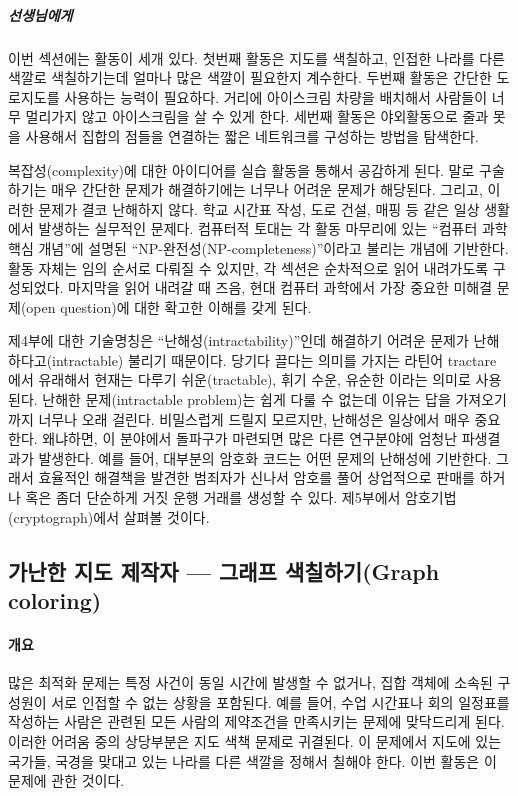 \documentclass[]{article}
\begin{document}
\subparagraph{선생님에게}\label{section-182}

이번 섹션에는 활동이 세개 있다. 첫번째 활동은 지도를 색칠하고, 인접한
나라를 다른 색깔로 색칠하기는데 얼마나 많은 색깔이 필요한지 계수한다.
두번째 활동은 간단한 도로지도를 사용하는 능력이 필요하다. 거리에
아이스크림 차량을 배치해서 사람들이 너무 멀리가지 않고 아이스크림을 살
수 있게 한다. 세번째 활동은 야외활동으로 줄과 못을 사용해서 집합의
점들을 연결하는 짧은 네트워크를 구성하는 방법을 탐색한다.

복잡성(complexity)에 대한 아이디어를 실습 활동을 통해서 공감하게 된다.
말로 구술하기는 매우 간단한 문제가 해결하기에는 너무나 어려운 문제가
해당된다. 그리고, 이러한 문제가 결코 난해하지 않다. 학교 시간표 작성,
도로 건설, 매핑 등 같은 일상 생활에서 발생하는 실무적인 문제다. 컴퓨터적
토대는 각 활동 마무리에 있는 ``컴퓨터 과학 핵심 개념''에 설명된
``NP-완전성(NP-completeness)''이라고 불리는 개념에 기반한다. 활동 자체는
임의 순서로 다뤄질 수 있지만, 각 섹션은 순차적으로 읽어 내려가도록
구성되었다. 마지막을 읽어 내려갈 때 즈음, 현대 컴퓨터 과학에서 가장
중요한 미해결 문제(open question)에 대한 확고한 이해를 갖게 된다.

제4부에 대한 기술명칭은 ``난해성(intractability)''인데 해결하기 어려운
문제가 난해하다고(intractable) 불리기 때문이다. 당기다 끌다는 의미를
가지는 라틴어 tractare 에서 유래해서 현재는 다루기 쉬운(tractable), 휘기
수운, 유순한 이라는 의미로 사용된다. 난해한 문제(intractable problem)는
쉽게 다룰 수 없는데 이유는 답을 가져오기까지 너무나 오래 걸린다.
비밀스럽게 드릴지 모르지만, 난해성은 일상에서 매우 중요한다. 왜냐하면,
이 분야에서 돌파구가 마련되면 많은 다른 연구분야에 엄청난 파생결과가
발생한다. 예를 들어, 대부분의 암호화 코드는 어떤 문제의 난해성에
기반한다. 그래서 효율적인 해결책을 발견한 범죄자가 신나서 암호를 풀어
상업적으로 판매를 하거나 혹은 좀더 단순하게 거짓 운행 거래를 생성할 수
있다. 제5부에서 암호기법(cryptograph)에서 살펴볼 것이다.

\subsection{가난한 지도 제작자 --- 그래프 색칠하기(Graph
coloring)}\label{mdash--graph-coloring}

\mbox{}\paragraph{개요}\label{section-183}

많은 최적화 문제는 특정 사건이 동일 시간에 발생할 수 없거나, 집합 객체에
소속된 구성원이 서로 인접할 수 없는 상황을 포함된다. 예를 들어, 수업
시간표나 회의 일정표를 작성하는 사람은 관련된 모든 사람의 제약조건을
만족시키는 문제에 맞닥드리게 된다. 이러한 어려움 중의 상당부분은 지도
색책 문제로 귀결된다. 이 문제에서 지도에 있는 국가들, 국경을 맞대고 있는
나라를 다른 색깔을 정해서 칠해야 한다. 이번 활동은 이 문제에 관한
것이다.
\end{document}
